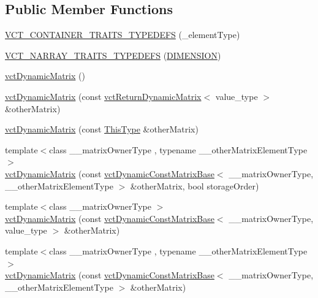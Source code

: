 \subsection*{Public Member Functions}
\begin{DoxyCompactItemize}
\item 
\hyperlink{classvct_dynamic_matrix_a2c357d90a642f7b2910e8f437a88aee2}{V\+C\+T\+\_\+\+C\+O\+N\+T\+A\+I\+N\+E\+R\+\_\+\+T\+R\+A\+I\+T\+S\+\_\+\+T\+Y\+P\+E\+D\+E\+F\+S} (\+\_\+element\+Type)
\item 
\hyperlink{classvct_dynamic_matrix_a2e3683c2478e4a056d11548af43bf186}{V\+C\+T\+\_\+\+N\+A\+R\+R\+A\+Y\+\_\+\+T\+R\+A\+I\+T\+S\+\_\+\+T\+Y\+P\+E\+D\+E\+F\+S} (\hyperlink{group__cisst_vector_gga20a06ac370f39d094a3249a08644471aa6b17aeb32aa45c3a75bad3506c9218dc}{D\+I\+M\+E\+N\+S\+I\+O\+N})
\item 
\hyperlink{classvct_dynamic_matrix_a69e9c9ae97fc01a45eca8d04cef247b9}{vct\+Dynamic\+Matrix} ()
\item 
\hyperlink{classvct_dynamic_matrix_a815391e06165da8cc6c4128ff59fd802}{vct\+Dynamic\+Matrix} (const \hyperlink{classvct_return_dynamic_matrix}{vct\+Return\+Dynamic\+Matrix}$<$ value\+\_\+type $>$ \&other\+Matrix)
\item 
\hyperlink{classvct_dynamic_matrix_aa8326cf4d021f6eaa2f4eac256250728}{vct\+Dynamic\+Matrix} (const \hyperlink{classvct_dynamic_const_matrix_base_ac4ff48cbe4d9de3fdef5a02447ffb9db}{This\+Type} \&other\+Matrix)
\item 
{\footnotesize template$<$class \+\_\+\+\_\+matrix\+Owner\+Type , typename \+\_\+\+\_\+other\+Matrix\+Element\+Type $>$ }\\\hyperlink{classvct_dynamic_matrix_a760990f58362687ee4cc3502ee90506c}{vct\+Dynamic\+Matrix} (const \hyperlink{classvct_dynamic_const_matrix_base}{vct\+Dynamic\+Const\+Matrix\+Base}$<$ \+\_\+\+\_\+matrix\+Owner\+Type, \+\_\+\+\_\+other\+Matrix\+Element\+Type $>$ \&other\+Matrix, bool storage\+Order)
\item 
{\footnotesize template$<$class \+\_\+\+\_\+matrix\+Owner\+Type $>$ }\\\hyperlink{classvct_dynamic_matrix_a38239f2b95f6e13a94cef953b770de40}{vct\+Dynamic\+Matrix} (const \hyperlink{classvct_dynamic_const_matrix_base}{vct\+Dynamic\+Const\+Matrix\+Base}$<$ \+\_\+\+\_\+matrix\+Owner\+Type, value\+\_\+type $>$ \&other\+Matrix)
\item 
{\footnotesize template$<$class \+\_\+\+\_\+matrix\+Owner\+Type , typename \+\_\+\+\_\+other\+Matrix\+Element\+Type $>$ }\\\hyperlink{classvct_dynamic_matrix_aa1aa433c332439a0f80c4c5518e2b790}{vct\+Dynamic\+Matrix} (const \hyperlink{classvct_dynamic_const_matrix_base}{vct\+Dynamic\+Const\+Matrix\+Base}$<$ \+\_\+\+\_\+matrix\+Owner\+Type, \+\_\+\+\_\+other\+Matrix\+Element\+Type $>$ \&other\+Matrix)

\end{DoxyCompactItemize}
